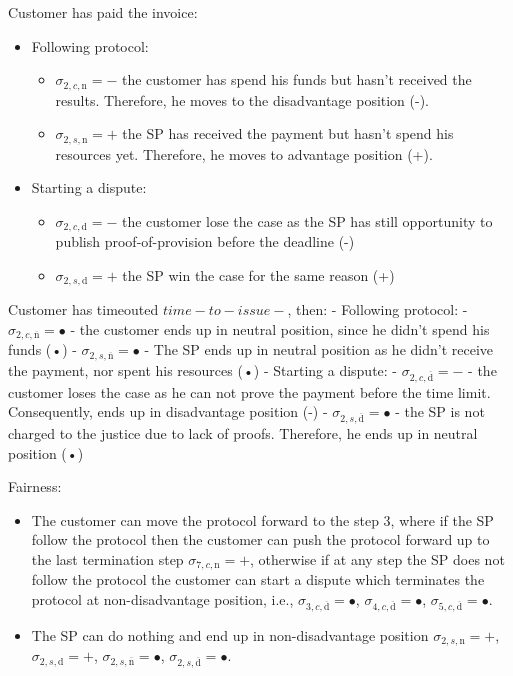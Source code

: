 \documentclass{article}
\begin{document}
Customer has paid the invoice:
\begin{itemize}
    \item Following protocol:
    \begin{itemize}
	    \item $\sigma_{2, c, \mathrm{n}} = -$ the customer has spend his funds but hasn't received the results. Therefore, he moves to the disadvantage position (-).
	    \item  $\sigma_{2, s, \mathrm{n}} = +$ the SP has received the payment but hasn't spend his resources yet. Therefore, he moves to advantage position (+).
    \end{itemize}
    \item Starting a dispute:
    \begin{itemize}
	\item $\sigma_{2, c, \mathrm{d}} = -$ the customer lose the case as the SP has still opportunity to publish proof-of-provision before the deadline (-)
	\item $\sigma_{2, s, \mathrm{d}} = +$ the SP win the case for the same reason (+)
	\end{itemize}
\end{itemize}

Customer has timeouted $time-to-issue-$, then:
- Following protocol:
	- $\sigma_{2, c, \overline{\mathrm{n}}} = •$ - the customer ends up in neutral position, since he didn't spend his funds (•)
	- $\sigma_{2, s, \overline{\mathrm{n}}} = •$ - The SP ends up in neutral position as he didn't receive the payment, nor spent his resources (•)
- Starting a dispute:
	- $\sigma_{2, c, \overline{\mathrm{d}}} = -$ - the customer loses the case as he can not prove the payment before the time limit. Consequently, ends up in disadvantage position (-)
	- $\sigma_{2, s, \overline{\mathrm{d}}} = •$ - the SP is not charged to the justice due to lack of proofs. Therefore, he ends up in neutral position (•)


Fairness:
\begin{itemize}
    \item The customer can move the protocol forward to the step 3, where if the SP follow the protocol then the customer can push the protocol forward up to the last termination step $\sigma_{7, c, \mathrm{n}} = +$, otherwise if at any step the SP does not follow the protocol the customer can start a dispute which terminates the protocol at non-disadvantage position, i.e., $\sigma_{3, c, \overline{\mathrm{d}}} = •$, $\sigma_{4, c, \overline{\mathrm{d}}} = •$, $\sigma_{5, c, \overline{\mathrm{d}}} = •$.
    \item The SP can do nothing and end up in non-disadvantage position $\sigma_{2, s, \mathrm{n}} = +$, $\sigma_{2, s, \mathrm{d}} = +$, $\sigma_{2, s, \overline{\mathrm{n}}} = •$, $\sigma_{2, s, \overline{\mathrm{d}}} = •$.
\end{itemize}
\end{document}
